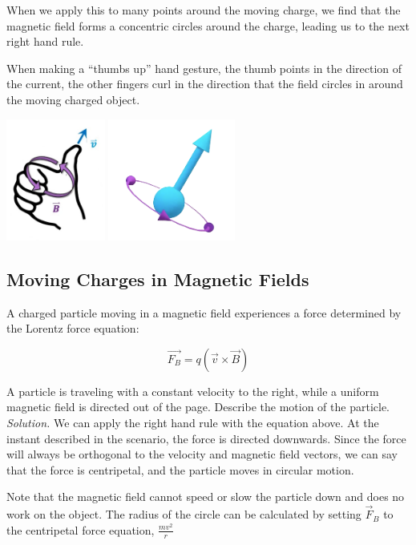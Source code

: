 \documentclass[12pt, titlepage]{article}
\begin{document}
When we apply this to many points around the moving charge, we find that the magnetic field forms a concentric circles around the charge, leading us to the next right hand rule.

When making a ``thumbs up'' hand gesture, the thumb points in the direction of the current, the other fingers curl in the direction that the field circles in around the moving charged object.
\begin{center}
    \includegraphics[height=4cm]{media/rh2_2.png}
    \includegraphics[height=4cm]{media/rh2.png}
\end{center}

\subsection*{Moving Charges in Magnetic Fields}

A charged particle moving in a magnetic field experiences a force determined by the Lorentz force equation:

\begin{equation*}
    \vec{F_B} = q(\vec{v}\times\vec{B})
\end{equation*}
\begin{Problem}
    A particle is traveling with a constant velocity to the right, while a uniform magnetic field is directed out of the page. Describe the motion of the particle.
    \tcblower
    \textit{Solution. } We can apply the right hand rule with the equation above. At the instant described in the scenario, the force is directed downwards. Since the force will always be orthogonal to the velocity and magnetic field vectors, we can say that the force is centripetal, and the particle moves in circular motion.
    
    Note that the magnetic field cannot speed or slow the particle down and does no work on the object. The radius of the circle can be calculated by setting $\vec{F}_B$ to the centripetal force equation, $\frac{mv^2}{r}$
\end{Problem}
\end{document}

